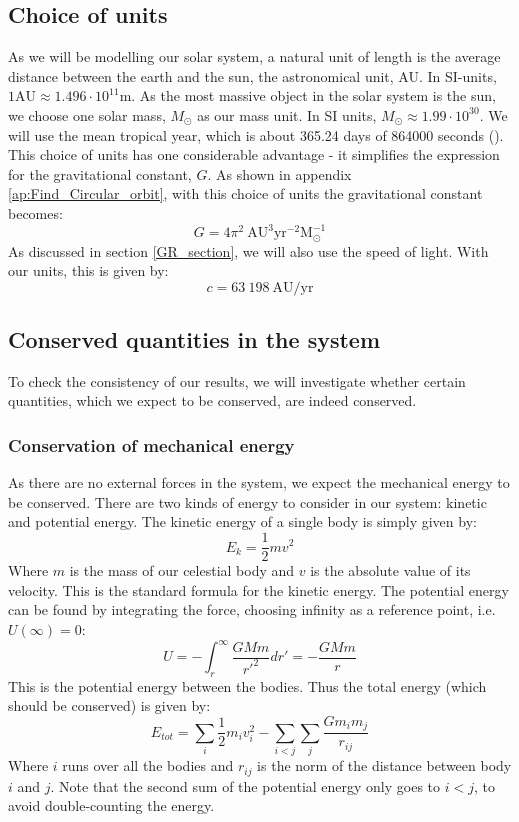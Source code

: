 \documentclass[a4paper, 10pt]{article}
\begin{document}
\subsection{Choice of units}
As we will be modelling our solar system, a natural unit of length is the average distance between the earth and the sun, the astronomical unit, AU. In SI-units, $1 \mathrm{AU} \approx 1.496 \cdot 10^{11} \mathrm{m}$. As the most massive object in the solar system is the sun, we choose one solar mass, $M_{\odot}$ as our mass unit. In SI units, $M_{\odot} \approx 1.99 \cdot 10^{30}$. We will use the mean tropical year, which is about 365.24 days of 864000 seconds (\cite{Tropical_year}). This choice of units has one considerable advantage - it simplifies the expression for the gravitational constant, $G$. As shown in appendix \ref{ap:Find_Circular_orbit}, with this choice of units the gravitational constant becomes:
$$G=4\pi^2 \ \mathrm{AU^{3}yr^{-2}M_{\odot}^{-1}}$$
As discussed in section \ref{GR_section}, we will also use the speed of light. With our units, this is given by:
$$c=63\ 198 \ \mathrm{AU/yr}$$
\subsection{Conserved quantities in the system}\label{conservation_of_energy}
To check the consistency of our results, we will investigate whether certain quantities, which we expect to be conserved, are indeed conserved.
\subsubsection{Conservation of mechanical energy}
As there are no external forces in the system, we expect the mechanical energy to be conserved. There are two kinds of energy to consider in our system: kinetic and potential energy. The kinetic energy of a single body is simply given by:
$$E_{k}=\frac{1}{2}mv^2$$
Where $m$ is the mass of our celestial body and $v$ is the absolute value of its velocity. This is the standard formula for the kinetic energy. The potential energy can be found by integrating the force, choosing infinity as a reference point, i.e. $U(\infty)=0$:
$$U=-\int_r^{\infty} \frac{GMm}{r'^2} dr'=-\frac{GMm}{r}$$
This is the potential energy between the bodies. Thus the total energy (which should be conserved) is given by:
\begin{equation}\label{eq:total_energy}
E_{tot}=\sum_{i} \frac{1}{2}m_iv_i^2 - \sum_{i<j}\sum_{j}\frac{Gm_im_j}{r_{ij}}
\end{equation}
Where $i$ runs over all the bodies and $r_{ij}$ is the norm of the distance between body $i$ and $j$. Note that the second sum of the potential energy only goes to $i<j$, to avoid double-counting the energy.
\end{document}
